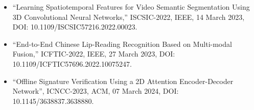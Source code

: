 \documentclass{article}
\begin{document}
\begin{itemize}
	\item ``Learning Spatiotemporal Features for Video Semantic Segmentation Using 3D Convolutional Neural Networks,''
	      ISCSIC-2022, IEEE, 14 March 2023, DOI: 10.1109/ISCSIC57216.2022.00023.
	\item ``End-to-End Chinese Lip-Reading Recognition Based on Multi-modal Fusion,'' ICFTIC-2022, IEEE, 27 March 2023, DOI: 10.1109/ICFTIC57696.2022.10075247.
	\item ``Offline Signature Verification Using a 2D Attention Encoder-Decoder Network'', ICNCC-2023, ACM, 07 March 2024, DOI: 10.1145/3638837.3638880.
\end{itemize}

\newpage
{}
\end{document}
